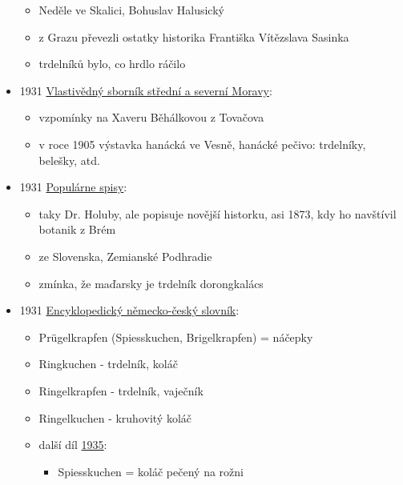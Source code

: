 \begin{itemize}
  \begin{itemize}
  \tightlist
  \item
    Neděle ve Skalici, Bohuslav Halusický
  \item
    z Grazu převezli ostatky historika Františka Vítězslava Sasinka
  \item
    trdelníků bylo, co hrdlo ráčilo
  \end{itemize}
\item
  1931
  \href{https://www.digitalniknihovna.cz/vkol/uuid/uuid:c2c8f360-7588-407d-9bc7-d0c59adde597}{Vlastivědný
  sborník střední a severní Moravy}:

  \begin{itemize}
  \tightlist
  \item
    vzpomínky na Xaveru Běhálkovou z Tovačova
  \item
    v roce 1905 výstavka hanácká ve Vesně, hanácké pečivo: trdelníky,
    belešky, atd.
  \end{itemize}
\item
  1931
  \href{https://ndk.cz/view/uuid:dc35f5d0-c266-11ed-ac82-5ef3fc9bb22f?page=uuid\%3Acb35b596-b227-47df-bc08-358154471f54}{Populárne
  spisy}:

  \begin{itemize}
  \tightlist
  \item
    taky Dr. Holuby, ale popisuje novější historku, asi 1873, kdy ho
    navštívil botanik z Brém
  \item
    ze Slovenska, Zemianské Podhradie
  \item
    zmínka, že maďarsky je trdelník dorongkalács
  \end{itemize}
\item
  1931
  \href{https://ceskadigitalniknihovna.cz/uuid/uuid:918bbf20-d4ea-11e7-a047-005056825209}{Encyklopedický
  německo-český slovník}:

  \begin{itemize}
  \tightlist
  \item
    Prügelkrapfen (Spiesskuchen, Brigelkrapfen) = náčepky
  \item
    Ringkuchen - trdelník, koláč
  \item
    Ringelkrapfen - trdelník, vaječník
  \item
    Ringelkuchen - kruhovitý koláč
  \item
    další díl
    \href{https://ceskadigitalniknihovna.cz/uuid/uuid:83ae629b-8a1b-4b33-a2cb-0141786babd8}{1935}:

    \begin{itemize}
    \tightlist
    \item
      Spiesskuchen = koláč pečený na rožni


\end{itemize}
\end{itemize}
\end{itemize}
